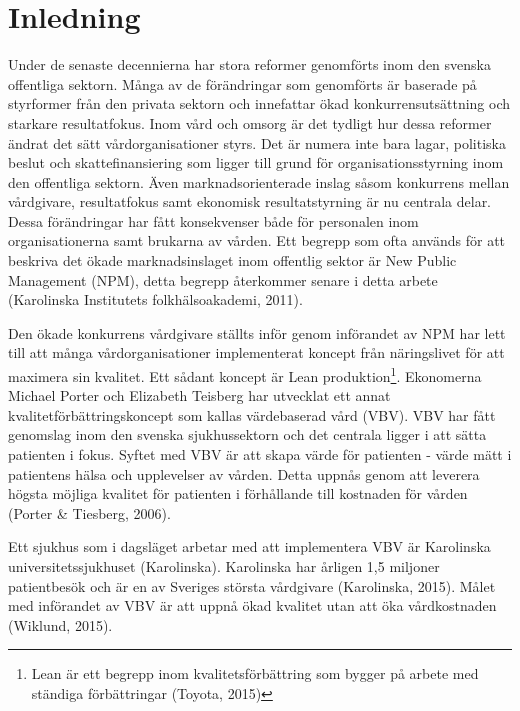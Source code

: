 \tableofcontents

\newpage

\listoffigures
\begingroup
\let\clearpage\relax
\listoftables
\endgroup

\newpage

\clearpage
{} 

\section{Inledning}

Under de senaste decennierna har stora reformer genomförts inom den svenska offentliga sektorn. Många av de förändringar som genomförts är baserade på styrformer från den privata sektorn och innefattar ökad konkurrensutsättning och starkare resultatfokus. Inom vård och omsorg är det tydligt hur dessa reformer ändrat det sätt vårdorganisationer styrs. Det är numera inte bara lagar, politiska beslut och skattefinansiering som ligger till grund för organisationsstyrning inom den offentliga sektorn. Även marknadsorienterade inslag såsom konkurrens mellan vårdgivare, resultatfokus samt ekonomisk resultatstyrning är nu centrala delar. Dessa förändringar har fått konsekvenser både för personalen inom organisationerna samt brukarna av vården. Ett begrepp som ofta används för att beskriva det ökade marknadsinslaget inom offentlig sektor är New Public Management (NPM), detta begrepp återkommer senare i detta arbete (Karolinska Institutets folkhälsoakademi, 2011).
 
Den ökade konkurrens vårdgivare ställts inför genom införandet av NPM har lett till att många vårdorganisationer implementerat koncept från näringslivet för att maximera sin kvalitet. Ett sådant koncept är Lean produktion\footnote{ Lean är ett begrepp inom kvalitetsförbättring som bygger på arbete med ständiga förbättringar (Toyota, 2015)}. Ekonomerna Michael Porter och Elizabeth Teisberg har utvecklat ett annat kvalitetförbättringskoncept som kallas värdebaserad vård (VBV). VBV har fått genomslag inom den svenska sjukhussektorn och det centrala ligger i att sätta patienten i fokus. Syftet med VBV är att skapa värde för patienten - värde mätt i patientens hälsa och upplevelser av vården. Detta uppnås genom att leverera högsta möjliga kvalitet för patienten i förhållande till kostnaden för vården (Porter \& Tiesberg, 2006).
 
Ett sjukhus som i dagsläget arbetar med att implementera VBV är Karolinska universitetssjukhuset (Karolinska). Karolinska har årligen 1,5 miljoner patientbesök och är en av Sveriges största vårdgivare (Karolinska, 2015). Målet med införandet av VBV är att uppnå ökad kvalitet utan att öka vårdkostnaden (Wiklund, 2015).

